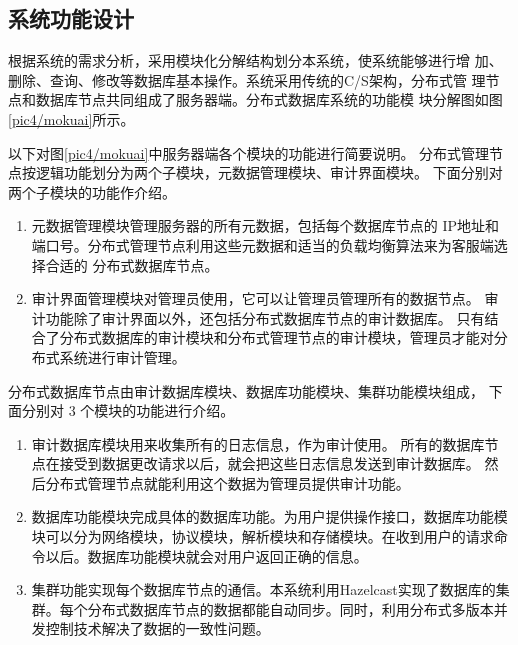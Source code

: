 \subsection{系统功能设计}
根据系统的需求分析，采用模块化分解结构划分本系统，使系统能够进行增
加、删除、查询、修改等数据库基本操作。系统采用传统的C/S架构，分布式管
理节点和数据库节点共同组成了服务器端。分布式数据库系统的功能模
块分解图如图\ref{pic4/mokuai}所示。

以下对图\ref{pic4/mokuai}中服务器端各个模块的功能进行简要说明。
分布式管理节点按逻辑功能划分为两个子模块，元数据管理模块、审计界面模块。
下面分别对两个子模块的功能作介绍。
\begin{enumerate}[fullwidth,itemindent=2em,listparindent=2em]
	\item 元数据管理模块管理服务器的所有元数据，包括每个数据库节点的
	IP地址和端口号。分布式管理节点利用这些元数据和适当的负载均衡算法来为客服端选择合适的
	分布式数据库节点。
	\item 审计界面管理模块对管理员使用，它可以让管理员管理所有的数据节点。
	审计功能除了审计界面以外，还包括分布式数据库节点的审计数据库。
	只有结合了分布式数据库的审计模块和分布式管理节点的审计模块，管理员才能对分布式系统进行审计管理。
\end{enumerate}

分布式数据库节点由审计数据库模块、数据库功能模块、集群功能模块组成，
 下面分别对 3 个模块的功能进行介绍。
 \begin{enumerate}[fullwidth,itemindent=2em,listparindent=2em]
 	\item 审计数据库模块用来收集所有的日志信息，作为审计使用。
 	所有的数据库节点在接受到数据更改请求以后，就会把这些日志信息发送到审计数据库。
 	然后分布式管理节点就能利用这个数据为管理员提供审计功能。
 	\item 数据库功能模块完成具体的数据库功能。为用户提供操作接口，数据库功能模块可以分为网络模块，协议模块，解析模块和存储模块。在收到用户的请求命令以后。数据库功能模块就会对用户返回正确的信息。
 	\item 集群功能实现每个数据库节点的通信。本系统利用Hazelcast实现了数据库的集群。每个分布式数据库节点的数据都能自动同步。同时，利用分布式多版本并发控制技术解决了数据的一致性问题。
 \end{enumerate}
